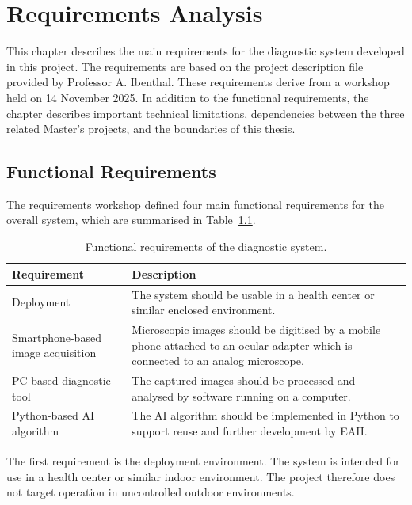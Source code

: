 \chapter{Requirements Analysis}
\label{chap:requirements-analysis}

This chapter describes the main requirements for the diagnostic system developed in this project. The requirements are based on the project description file provided by Professor A. Ibenthal. These requirements derive from a workshop held on 14 November 2025. In addition to the functional requirements, the chapter describes important technical limitations, dependencies between the three related Master's projects, and the boundaries of this thesis.

\section{Functional Requirements}
\label{sec:functional_requirements}

The requirements workshop defined four main functional requirements for the overall system, which are summarised in Table~\ref{tab:functional_requirements}.

\begin{table}[htbp]
\centering
\caption{Functional requirements of the diagnostic system.}
\label{tab:functional_requirements}
\begin{tabularx}{\textwidth}{|p{4.2cm}|X|}
\hline
\textbf{Requirement} & \textbf{Description} \\
\hline
Deployment &
The system should be usable in a health center or similar enclosed environment. \\
\hline
Smartphone-based image acquisition &
Microscopic images should be digitised by a mobile phone attached to an ocular adapter which is connected to an analog microscope. \\
\hline
PC-based diagnostic tool &
The captured images should be processed and analysed by software running on a computer. \\
\hline
Python-based AI algorithm &
The AI algorithm should be implemented in Python to support reuse and further development by EAII. \\
\hline
\end{tabularx}
\end{table}

\FloatBarrier

The first requirement is the deployment environment. The system is intended for use in a health center or similar indoor environment. The project therefore does not target operation in uncontrolled outdoor environments.

